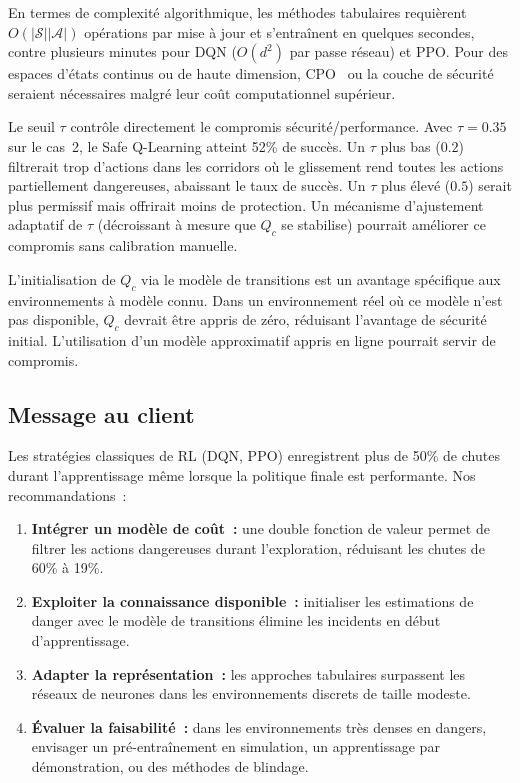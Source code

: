 \documentclass{article}
\begin{document}
En termes de complexité algorithmique, les méthodes tabulaires requièrent $O(|\mathcal{S}||\mathcal{A}|)$ opérations par mise à jour et s'entraînent en quelques secondes, contre plusieurs minutes pour DQN ($O(d^2)$ par passe réseau) et PPO. Pour des espaces d'états continus ou de haute dimension, CPO~\cite{achiam2017constrained} ou la couche de sécurité~\cite{dalal2018safe} seraient nécessaires malgré leur coût computationnel supérieur.

Le seuil $\tau$ contrôle directement le compromis sécurité/performance. Avec $\tau = 0.35$ sur le cas~2, le Safe Q-Learning atteint 52\% de succès. Un $\tau$ plus bas ($0.2$) filtrerait trop d'actions dans les corridors où le glissement rend toutes les actions partiellement dangereuses, abaissant le taux de succès. Un $\tau$ plus élevé ($0.5$) serait plus permissif mais offrirait moins de protection. Un mécanisme d'ajustement adaptatif de $\tau$ (décroissant à mesure que $Q_c$ se stabilise) pourrait améliorer ce compromis sans calibration manuelle.

L'initialisation de $Q_c$ via le modèle de transitions est un avantage spécifique aux environnements à modèle connu. Dans un environnement réel où ce modèle n'est pas disponible, $Q_c$ devrait être appris de zéro, réduisant l'avantage de sécurité initial. L'utilisation d'un modèle approximatif appris en ligne pourrait servir de compromis.

\subsection{Message au client}

Les stratégies classiques de RL (DQN, PPO) enregistrent plus de 50\% de chutes durant l'apprentissage même lorsque la politique finale est performante. Nos recommandations~:
\begin{enumerate}
    \item \textbf{Intégrer un modèle de coût~:} une double fonction de valeur permet de filtrer les actions dangereuses durant l'exploration, réduisant les chutes de 60\% à 19\%.
    \item \textbf{Exploiter la connaissance disponible~:} initialiser les estimations de danger avec le modèle de transitions élimine les incidents en début d'apprentissage.
    \item \textbf{Adapter la représentation~:} les approches tabulaires surpassent les réseaux de neurones dans les environnements discrets de taille modeste.
    \item \textbf{Évaluer la faisabilité~:} dans les environnements très denses en dangers, envisager un pré-entraînement en simulation, un apprentissage par démonstration, ou des méthodes de blindage.
\end{enumerate}

\newpage


\end{document}
